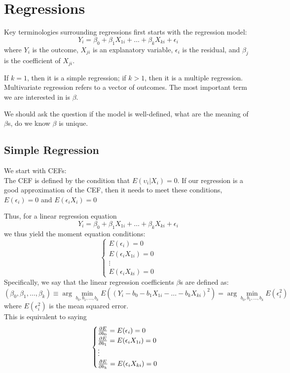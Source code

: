 \section{Regressions}
Key terminologies surrounding regressions first starts with the regression model:
$$Y_i = \beta_0 + \beta_1 X_{1i} + \dots + \beta_k X_{ki} + \epsilon_i$$
where $Y_i$ is the outcome, $X_{ji}$ is an explanatory variable, $\epsilon_i$ is the residual, and $\beta_j$ is the coefficient of $X_{ji}$.

If $k = 1$, then it is a simple regression; if $k > 1$, then it is a multiple regression. Multivariate regression refers to a vector of outcomes. The most important term we are interested in is $\beta$.

We should ask the question if the model is well-defined, what are the meaning of $\beta$s, do we know $\beta$ is unique.

\subsection{Simple Regression}
We start with CEFs: \\
The CEF is defined by the condition that $E(\upsilon_i | X_i) = 0$. If our regression is a good approximation of the CEF, then it needs to meet these conditions, $E(\epsilon_i) = 0$ and $E(\epsilon_iX_i) = 0$

Thus, for a linear regression equation
$$Y_i = \beta_0 + \beta_1 X_{1i} + \dots + \beta_k X_{ki} + \epsilon_i$$
we thus yield the moment equation conditions:
$$\begin{cases}
    E(\epsilon_i) = 0 \\
    E(\epsilon_iX_{1i}) = 0 \\
    \vdots \\
    E(\epsilon_iX_{ki}) = 0
\end{cases}$$
Specifically, we say that the linear regression coefficients $\beta$s are defined as:
$$(\beta_0, \beta_1, \dots, \beta_k) \equiv \arg \min_{b_0, b_1, \dots, b_k} E((Y_i - b_0 - b_1 X_{1i} - \dots - b_k X_{ki})^2) = \arg \min_{b_0, b_1, \dots, b_k} E(\epsilon_i^2)$$
where $E(\epsilon_i^2)$ is the mean squared error. \\
This is equivalent to saying
$$\begin{cases}
    \pdv{E}{b_0} = E(\epsilon_i) = 0 \\
    \pdv{E}{b_1} = E(\epsilon_iX_{1i}) = 0 \\
    \vdots \\
    \pdv{E}{b_k} = E(\epsilon_iX_{ki}) = 0
\end{cases}$$

